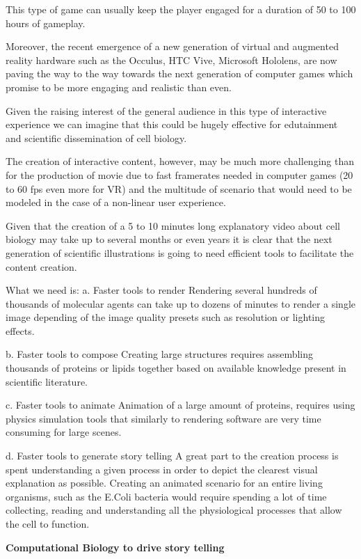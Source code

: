 This type of game can usually keep the player engaged for a duration of 50 to 100 hours of gameplay.

Moreover, the recent emergence of a new generation of virtual and augmented reality hardware such as the Occulus, HTC Vive, Microsoft Hololens, are now paving the way to the way towards the next generation of computer games which promise to be more engaging and realistic than even.

Given the raising interest of the general audience in this type of interactive experience we can imagine that this could be hugely effective for edutainment and scientific dissemination of cell biology.

The creation of interactive content, however, may be much more challenging than for the production of movie due to fast framerates needed in computer games (20 to 60 fps even more for VR) and the multitude of scenario that would need to be modeled in the case of a non-linear user experience.

Given that the creation of a 5 to 10 minutes long explanatory video about cell biology may take up to several months or even years it is clear that the next generation of scientific illustrations is going to need efficient tools to facilitate the content creation.

What we need is:
a. Faster tools to render
	Rendering several hundreds of thousands of molecular agents can take up to dozens of minutes to render a single image depending of the image quality presets such as resolution or lighting effects.

b. Faster tools to compose
	Creating large structures requires assembling thousands of proteins or lipids together based on available knowledge present in scientific literature.

c. Faster tools to animate
	Animation of a large amount of proteins, requires using physics simulation tools that similarly to rendering software are very time consuming for large scenes.

d. Faster tools to generate story telling
	A great part to the creation process is spent understanding a given process in order to depict the clearest visual explanation as possible.
	Creating an animated scenario for an entire living organisms, such as the E.Coli bacteria would require spending a lot of time collecting, reading and understanding all the physiological processes that allow the cell to function.




\textbf{Computational Biology to drive story telling}

